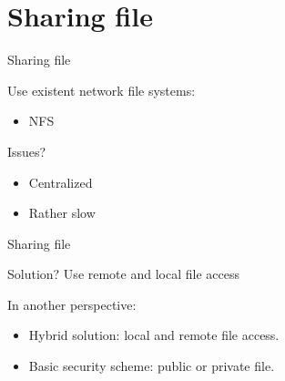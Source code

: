 \documentclass{beamer}
\begin{document}
%
%

\section{Sharing file}
	
	\begin{frame}{Sharing file}	
	
		Use existent network file systems:
		\begin{itemize}
		\item NFS
		\end{itemize}
		
		Issues?
		\pause 
		
		\begin{itemize}
		\item Centralized
		\item Rather slow
		\end{itemize}		

	\end{frame}	
	
	\begin{frame}{Sharing file}	
	
		\begin{block}{Solution?}
			Use remote and local file access
		\end{block}
		
		In another perspective:		
		\begin{itemize}
		\item Hybrid solution: local and remote file access.
		\item Basic security scheme: public or private file.
		\end{itemize}

	\end{frame}
\end{document}
